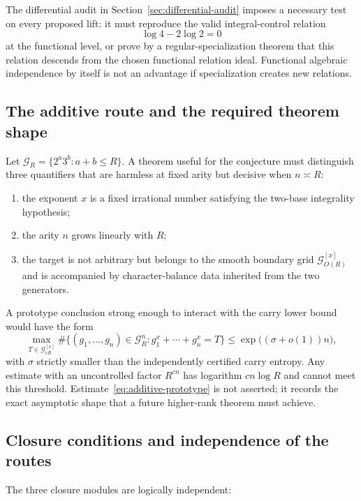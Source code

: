\documentclass[11pt,oneside]{article}
\theoremstyle{definition}
\theoremstyle{remark}
\newcommand{\cG}{\mathcal G}
\begin{document}
The differential audit in Section~\ref{sec:differential-audit} imposes a necessary test on every
proposed lift: it must reproduce the valid integral-control relation
\[
 \log4-2\log2=0
\]
at the functional level, or prove by a regular-specialization theorem that this relation descends
from the chosen functional relation ideal.  Functional algebraic independence by itself is not an
advantage if specialization creates new relations.

\subsection{The additive route and the required theorem shape}

Let $\cG_R=\{2^a3^b:a+b\le R\}$.  A theorem useful for the conjecture must distinguish three
quantifiers that are harmless at fixed arity but decisive when $n\asymp R$:

\begin{enumerate}
\item the exponent $x$ is a fixed irrational number satisfying the two-base integrality
hypothesis;
\item the arity $n$ grows linearly with $R$;
\item the target is not arbitrary but belongs to the smooth boundary grid
$\cG_{O(R)}^{[x]}$ and is accompanied by character-balance data inherited from the two generators.
\end{enumerate}

A prototype conclusion strong enough to interact with the carry lower bound would have the form
\begin{equation}
 \max_{T\in\cG_{cR}^{[x]}}
 \#\{(g_1,\ldots,g_n)\in\cG_R^n:g_1^x+\cdots+g_n^x=T\}
 \le \exp\bigl((\sigma+o(1))n\bigr),
 \label{eq:additive-prototype}
\end{equation}
with $\sigma$ strictly smaller than the independently certified carry entropy.  Any estimate with
an uncontrolled factor $R^{cn}$ has logarithm $cn\log R$ and cannot meet this threshold.
Estimate~\eqref{eq:additive-prototype} is not asserted; it records the exact asymptotic shape that a
future higher-rank theorem must achieve.

\subsection{Closure conditions and independence of the routes}

The three closure modules are logically independent:
\end{document}
